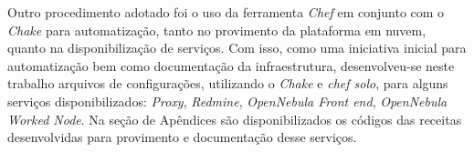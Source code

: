 \begin{apendicesenv}
Outro procedimento adotado foi o uso da ferramenta \textit{Chef} em conjunto com o \textit{Chake} para automatização, tanto no provimento da plataforma em nuvem, quanto na disponibilização de serviços. Com isso, como uma iniciativa inicial para automatização bem como documentação da infraestrutura, desenvolveu-se neste trabalho arquivos de configurações, utilizando o \textit{Chake} e \textit{chef solo}, para alguns serviços disponibilizados: \textit{Proxy}, \textit{Redmine}, \textit{OpenNebula Front end}, \textit{OpenNebula Worked Node}. Na seção de Apêndices são disponibilizados os códigos das receitas desenvolvidas para provimento e documentação desse serviços.














\end{apendicesenv}
